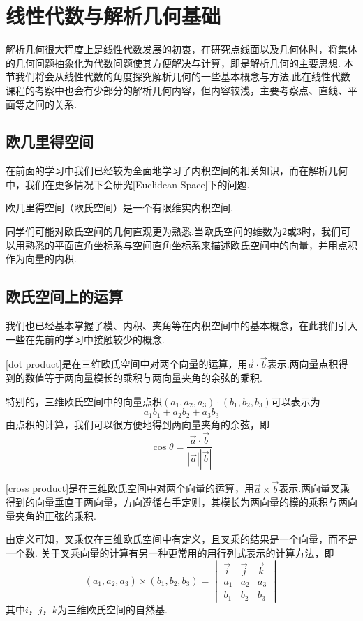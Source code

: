 \chapter{线性代数与解析几何基础}

解析几何很大程度上是线性代数发展的初衷，在研究点线面以及几何体时，将集体的几何问题抽象化为代数问题使其方便解决与计算，即是解析几何的主要思想.
本节我们将会从线性代数的角度探究解析几何的一些基本概念与方法.此在线性代数课程的考察中也会有少部分的解析几何内容，但内容较浅，主要考察点、直线、平面等之间的关系.
\section{欧几里得空间}
在前面的学习中我们已经较为全面地学习了内积空间的相关知识，而在解析几何中，我们在更多情况下会研究[Euclidean Space]下的问题.
\begin{definition}[欧几里得空间]
    欧几里得空间（欧氏空间）是一个有限维实内积空间.
\end{definition}
同学们可能对欧氏空间的几何直观更为熟悉.当欧氏空间的维数为$2$或$3$时，我们可以用熟悉的平面直角坐标系与空间直角坐标系来描述欧氏空间中的向量，并用点积作为向量的内积.
\section{欧氏空间上的运算}
我们也已经基本掌握了模、内积、夹角等在内积空间中的基本概念，在此我们引入一些在先前的学习中接触较少的概念.
\begin{definition}
    [dot product]是在三维欧氏空间中对两个向量的运算，用$\vec{a}\cdot\vec{b}$表示.两向量点积得到的数值等于两向量模长的乘积与两向量夹角的余弦的乘积.
\end{definition}
特别的，三维欧氏空间中的向量点积$(a_1,a_2,a_3)\cdot(b_1,b_2,b_3)$可以表示为$$a_1b_1+a_2b_2+a_3b_3$$
由点积的计算，我们可以很方便地得到两向量夹角的余弦，即$$\cos\theta=\frac{\vec{a}\cdot\vec{b}}{|\vec{a}||\vec{b}|}$$
\begin{definition}
    [cross product]是在三维欧氏空间中对两个向量的运算，用$\vec{a}\times\vec{b}$表示.两向量叉乘得到的向量垂直于两向量，方向遵循右手定则，其模长为两向量的模的乘积与两向量夹角的正弦的乘积.
\end{definition}
由定义可知，叉乘仅在三维欧氏空间中有定义，且叉乘的结果是一个向量，而不是一个数.
关于叉乘向量的计算有另一种更常用的用行列式表示的计算方法，即
$$(a_1,a_2,a_3)\times(b_1,b_2,b_3)=\begin{vmatrix}
    \vec{i}&\vec{j}&\vec{k}\\
    a_1&a_2&a_3\\
    b_1&b_2&b_3
\end{vmatrix}$$
其中$i$，$j$，$k$为三维欧氏空间的自然基.

